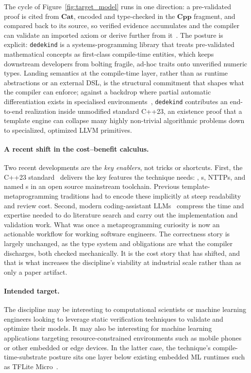 \documentclass[11pt, a4paper]{article}
\begin{document}
The cycle of Figure~\ref{fig:target_model} runs in one direction: a pre-validated proof is cited from $\mathbf{Cat}$, encoded and type-checked in the $\mathbf{Cpp}$ fragment, and compared back to its source, so verified evidence accumulates and the compiler can validate an imported axiom or derive further from it~\cite{wadler2015propositions}.
The posture is explicit: \texttt{dedekind} is a systems-programming library that treats pre-validated mathematical concepts as first-class compile-time entities, which keeps downstream developers from bolting fragile, ad-hoc traits onto unverified numeric types.
Landing semantics at the compile-time layer, rather than as runtime abstractions or an external DSL, is the structural commitment that shapes what the compiler can enforce; against a backdrop where partial automatic differentiation exists in specialised environments~\cite{elliott2018simple, jakob2019enoki}, \texttt{dedekind} contributes an end-to-end realization inside unmodified standard C++23, an existence proof that a template engine can collapse many highly non-trivial algorithmic problems down to specialized, optimized LLVM primitives.

\paragraph{A recent shift in the cost--benefit calculus.}
Two recent developments are the \emph{key enablers}, not tricks or shortcuts.
First, the C++23 standard~\cite{cpp23standard} delivers the key features the technique needs: , s, NTTPs, and named s in an open source mainstream toolchain.
Previous template-metaprogramming traditions had to encode these implicitly at steep readability and review cost.
Second, modern coding-assistant LLMs~\cite{chen2021evaluating} compress the time and expertise needed to do literature search and carry out the implementation and validation work.
What was once a metaprogramming curiosity is now an actionable workflow for working software engineers.
The correctness story is largely unchanged, as the type system and  obligations are what the compiler discharges, both checked mechanically.
It is the cost story that has shifted, and that is what increases the discipline's viability at industrial scale rather than as only a paper artifact.

\paragraph{Intended target.}
The discipline may be interesting to computational scientists or machine learning engineers looking to leverage static verification techniques to validate and optimize their models.
It may also be interesting for machine learning applications targeting resource-constrained environments such as mobile phones or other embedded or edge devices.
In the latter case, the technique's compile-time-substrate posture sits one layer below existing embedded ML runtimes such as TFLite Micro~\cite{david2021tflm}.
\end{document}
